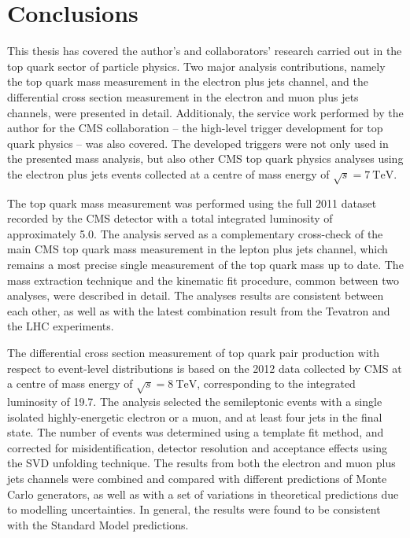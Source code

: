 
\def\baselinestretch{1}
\chapter{Conclusions}
\label{c:conclusions}
\ifpdf
    \graphicspath{{Conclusions/plots/}}
\else
    \graphicspath{{Conclusions/plots/EPS/}{Conclusions/plots/}}
\fi

\def\baselinestretch{1.66}

This thesis has covered the author's and collaborators' research carried out in the top quark sector of particle
physics. Two major analysis contributions, namely the top quark mass measurement in the electron plus jets channel, and
the \ttbar differential cross section measurement in the electron and muon plus jets channels, were presented in detail.
Additionaly, the service work performed by the author for the CMS collaboration -- the high-level trigger development
for top quark physics -- was also covered. The developed triggers were not only used in the presented mass analysis, but
also other CMS top quark physics analyses using the electron plus jets \ttbar events collected at a centre of mass
energy of $\sqrt{s} = \SI{7}{\TeV}$.

The top quark mass measurement was performed using the full 2011 dataset recorded by the CMS detector with a total
integrated luminosity of approximately \SI{5.0}{\fbinv}. The analysis served as a complementary cross-check of the main
CMS top quark mass measurement in the lepton plus jets channel, which remains a most precise single measurement of the
top quark mass up to date. The mass extraction technique and the kinematic fit procedure, common between two analyses,
were described in detail. The analyses results are consistent between each other, as well as with the latest combination
result from the Tevatron and the LHC experiments.

The differential cross section measurement of top quark pair production with respect to event-level distributions is
based on the 2012 data collected by CMS at a centre of mass energy of $\sqrt{s} = \SI{8}{\TeV}$, corresponding to the
integrated luminosity of \SI{19.7}{\fbinv}. The analysis selected the semileptonic \ttbar events with a single isolated
highly-energetic electron or a muon, and at least four jets in the final state. The number of \ttbar events was
determined using a template fit method, and corrected for misidentification, detector resolution and acceptance effects
using the SVD unfolding technique. The results from both the electron and muon plus jets channels were combined and
compared with different predictions of Monte Carlo generators, as well as with a set of variations in theoretical
predictions due to modelling uncertainties. In general, the results were found to be consistent with the Standard Model
predictions.

